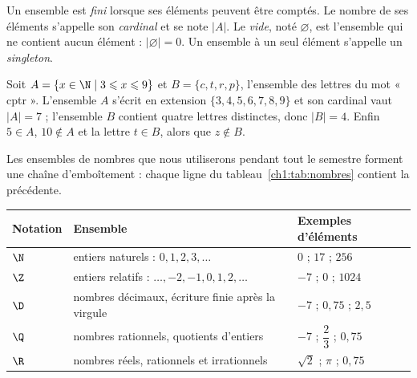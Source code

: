 \begin{definition}
Un ensemble est \emph{fini} lorsque ses éléments peuvent être comptés. Le nombre de ses éléments s'appelle son \emph{cardinal} et se note $|A|$. Le \emph{vide}, noté $\varnothing$, est l'ensemble qui ne contient aucun élément : $|\varnothing| = 0$. Un ensemble à un seul élément s'appelle un \emph{singleton}.
\end{definition}

\begin{exemple}
Soit $A = \{x \in \N \mid 3 \leqslant x \leqslant 9\}$ et $B = \{c, t, r, p\}$, l'ensemble des lettres du mot « cptr ». L'ensemble $A$ s'écrit en extension $\{3, 4, 5, 6, 7, 8, 9\}$ et son cardinal vaut $|A| = 7$ ; l'ensemble $B$ contient quatre lettres distinctes, donc $|B| = 4$. Enfin $5 \in A$, $10 \notin A$ et la lettre $t \in B$, alors que $z \notin B$.
\end{exemple}

Les ensembles de nombres que nous utiliserons pendant tout le semestre forment une chaîne d'emboîtement : chaque ligne du tableau~\ref{ch1:tab:nombres} contient la précédente.

\begin{center}
\small
\begin{tabular}{L{1.6cm}L{7.0cm}L{6.2cm}}
\toprule
{}\textbf{Notation} & \textbf{Ensemble} & \textbf{Exemples d'éléments}\\
\midrule
$\N$ & entiers naturels : $0, 1, 2, 3, \dots$ & $0$ ; $17$ ; $256$\\
$\Z$ & entiers relatifs : $\dots, -2, -1, 0, 1, 2, \dots$ & $-7$ ; $0$ ; $1024$\\
$\D$ & nombres décimaux, écriture finie après la virgule & $-7$ ; $0{,}75$ ; $2{,}5$\\
$\Q$ & nombres rationnels, quotients d'entiers & $-7$ ; $\dfrac{2}{3}$ ; $0{,}75$\\
$\R$ & nombres réels, rationnels et irrationnels & $\sqrt{2}$ ; $\pi$ ; $0{,}75$\\
\bottomrule
\end{tabular}
\label{ch1:tab:nombres}
\end{center}

